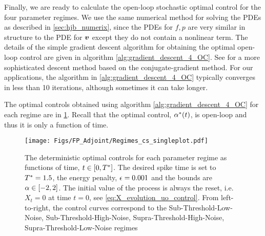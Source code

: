 Finally, we are ready to calculate the open-loop stochastic optimal control for
the four parameter regimes. We use the same numerical method for solving the
PDEs as described in \cref{sec:hjb_numerix}, since the PDEs for $f,p$ are very
similar in structure to the PDE for ${ \boldsymbol{v} }$ except they do not contain a nonlinear
term. The details of the simple gradient descent algorithm for obtaining the
optimal open-loop control are given in algorithm
\ref{alg:gradient_descent_4_OC}. See \cite{Annunziato2013} for a more
sophisticated descent method based on the conjugate-gradient method. For our
applications, the algorithm in \ref{alg:gradient_descent_4_OC} typically
converges in less than 10 iterations, although sometimes it can take longer. 

The optimal controls obtained using algorithm \ref{alg:gradient_descent_4_OC} for each regime are in
\cref{fig:FBK_Regimes_cs}. Recall that the optimal control, $\alpha^*(t)$, is open-loop and thus it is only a function of time.
\begin{figure}[htp]
\begin{center}
  \texttt{[image: Figs/FP\_Adjoint/Regimes\_cs\_singleplot.pdf]}
  \caption[Open-loop Optimal Control numerical solution]{The deterministic
  optimal controls for each parameter regime as functions of time, $t \in [0, { T^* }]$.
  The desired spike time is set to ${ T^* }=1.5$, the energy penalty, ${\epsilon}
  = 0.001$ and the bounds are $\alpha \in [-2,2]$.
  The initial value of the process is always the reset, i.e. $X_t=0$ at
time $t=0$, see \cref{eq:X_evolution_uo_control}.
  From left-to-right, the control curves correspond to the
  Sub-Threshold-Low-Noise, Sub-Threshold-High-Noise, Supra-Threshold-High-Noise,
  Supra-Threshold-Low-Noise regimes
  }
  \label{fig:FBK_Regimes_cs}
\end{center}  
\end{figure}   

